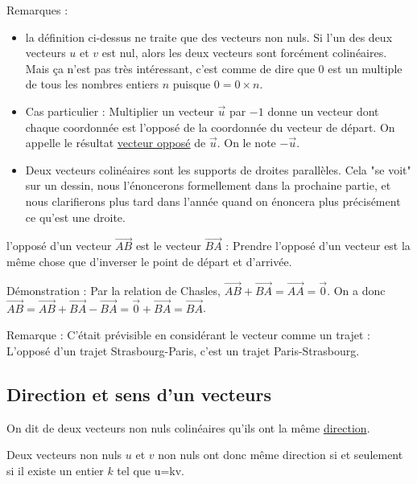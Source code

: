 \documentclass[10pt,a4paper,oneside]{book}
\begin{document}
Remarques : 
\begin{itemize}
  \item la définition ci-dessus ne traite que des vecteurs non nuls. Si l'un des deux vecteurs $u$ et $v$ est nul, alors les deux vecteurs sont forcément colinéaires. Mais ça n'est pas très intéressant, c'est comme de dire que $0$ est un multiple de tous les nombres entiers $n$ puisque $0=0 \times n$.
  \item Cas particulier : Multiplier un vecteur $\overrightarrow{u}$ par $-1$ donne un vecteur dont chaque coordonnée 
  est l'opposé de la coordonnée du vecteur de départ. On appelle le résultat \underline{vecteur opposé} de $\overrightarrow{u}$. On le note $-\overrightarrow{u}$.
  \item Deux vecteurs colinéaires sont les supports de droites parallèles. Cela "se voit" sur un dessin, nous l'énoncerons formellement dans la prochaine partie, et nous clarifierons plus tard dans l'année quand on énoncera plus précisément ce qu'est une droite. 
\end{itemize}

\begin{prop}
  l'opposé d'un vecteur $\overrightarrow{AB}$ est le vecteur $\overrightarrow{BA}$ : Prendre l'opposé d'un vecteur est la même chose que d'inverser le point de départ et d'arrivée. 
\end{prop}

Démonstration : Par la relation de Chasles, $\overrightarrow{AB} + \overrightarrow{BA} = \overrightarrow{AA} = \overrightarrow{0}$. On a donc $\overrightarrow{AB} = \overrightarrow{AB} + \overrightarrow{BA} - \overrightarrow{BA} = \overrightarrow{0} + \overrightarrow{BA} = \overrightarrow{BA}$.

Remarque : C'était prévisible en considérant le vecteur comme un trajet : L'opposé d'un trajet Strasbourg-Paris, c'est un trajet Paris-Strasbourg.  

\subsection{Direction et sens d'un vecteurs}

\begin{de}
  On dit de deux vecteurs non nuls colinéaires qu'ils ont la même \underline{direction}.
  
  Deux vecteurs non nuls $u$ et $v$ non nuls ont donc même direction si et seulement si il existe un entier $k$ tel que u=kv. 
\end{de}
\end{document}
